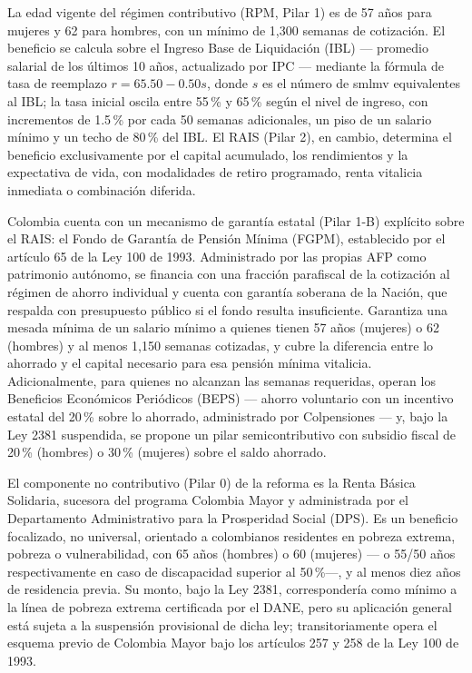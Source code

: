 \documentclass[12pt, letterpaper]{article}
\begin{document}
La edad vigente del régimen contributivo (RPM, Pilar 1) es de 57 años para mujeres y 62 para hombres, con un mínimo de 1{,}300 semanas de cotización. El beneficio se calcula sobre el Ingreso Base de Liquidación (IBL) --- promedio salarial de los últimos 10 años, actualizado por IPC --- mediante la fórmula de tasa de reemplazo $r = 65.50 - 0.50s$, donde $s$ es el número de smlmv equivalentes al IBL; la tasa inicial oscila entre 55\,\% y 65\,\% según el nivel de ingreso, con incrementos de 1.5\,\% por cada 50 semanas adicionales, un piso de un salario mínimo y un techo de 80\,\% del IBL. El RAIS (Pilar 2), en cambio, determina el beneficio exclusivamente por el capital acumulado, los rendimientos y la expectativa de vida, con modalidades de retiro programado, renta vitalicia inmediata o combinación diferida.

Colombia cuenta con un mecanismo de garantía estatal (Pilar 1-B) explícito sobre el RAIS: el Fondo de Garantía de Pensión Mínima (FGPM), establecido por el artículo 65 de la Ley 100 de 1993. Administrado por las propias AFP como patrimonio autónomo, se financia con una fracción parafiscal de la cotización al régimen de ahorro individual y cuenta con garantía soberana de la Nación, que respalda con presupuesto público si el fondo resulta insuficiente. Garantiza una mesada mínima de un salario mínimo a quienes tienen 57 años (mujeres) o 62 (hombres) y al menos 1{,}150 semanas cotizadas, y cubre la diferencia entre lo ahorrado y el capital necesario para esa pensión mínima vitalicia. Adicionalmente, para quienes no alcanzan las semanas requeridas, operan los Beneficios Económicos Periódicos (BEPS) --- ahorro voluntario con un incentivo estatal del 20\,\% sobre lo ahorrado, administrado por Colpensiones --- y, bajo la Ley 2381 suspendida, se propone un pilar semicontributivo con subsidio fiscal de 20\,\% (hombres) o 30\,\% (mujeres) sobre el saldo ahorrado.

El componente no contributivo (Pilar 0) de la reforma es la Renta Básica Solidaria, sucesora del programa Colombia Mayor y administrada por el Departamento Administrativo para la Prosperidad Social (DPS). Es un beneficio focalizado, no universal, orientado a colombianos residentes en pobreza extrema, pobreza o vulnerabilidad, con 65 años (hombres) o 60 (mujeres) --- o 55/50 años respectivamente en caso de discapacidad superior al 50\,\%---, y al menos diez años de residencia previa. Su monto, bajo la Ley 2381, correspondería como mínimo a la línea de pobreza extrema certificada por el DANE, pero su aplicación general está sujeta a la suspensión provisional de dicha ley; transitoriamente opera el esquema previo de Colombia Mayor bajo los artículos 257 y 258 de la Ley 100 de 1993.
\end{document}
